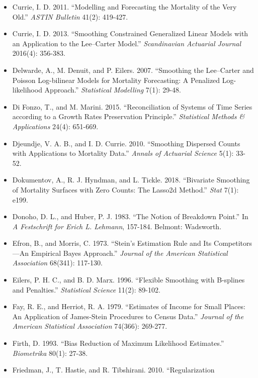 \documentclass[UTF8, fontset=macnew, a4paper, 12pt]{ctexart}
\begin{document}
\begin{itemize}[leftmargin=2em, label={}, itemsep=3pt]
        4(4): 279-298.
  \item[] Currie, I. D. 2011. ``Modelling and Forecasting the Mortality of the
        Very Old.'' \textit{ASTIN Bulletin} 41(2): 419-427.
  \item[] Currie, I. D. 2013. ``Smoothing Constrained Generalized Linear Models
        with an Application to the Lee--Carter Model.''
        \textit{Scandinavian Actuarial Journal} 2016(4): 356-383.
  \item[] Delwarde, A., M. Denuit, and P. Eilers. 2007. ``Smoothing the
        Lee--Carter and Poisson Log-bilinear Models for Mortality Forecasting:
        A Penalized Log-likelihood Approach.''
        \textit{Statistical Modelling} 7(1): 29-48.
  \item[] Di Fonzo, T., and M. Marini. 2015. ``Reconciliation of Systems of
        Time Series according to a Growth Rates Preservation Principle.''
        \textit{Statistical Methods \& Applications} 24(4): 651-669.
  \item[] Djeundje, V. A. B., and I. D. Currie. 2010. ``Smoothing Dispersed
        Counts with Applications to Mortality Data.''
        \textit{Annals of Actuarial Science} 5(1): 33-52.
  \item[] Dokumentov, A., R. J. Hyndman, and L. Tickle. 2018. ``Bivariate
        Smoothing of Mortality Surfaces with Zero Counts: The Lasso2d Method.''
        \textit{Stat} 7(1): e199.
  \item[] Donoho, D. L., and Huber, P. J. 1983. ``The Notion of Breakdown Point.''
        In \textit{A Festschrift for Erich L. Lehmann}, 157-184. Belmont: Wadsworth.
  \item[] Efron, B., and Morris, C. 1973. ``Stein's Estimation Rule and Its
        Competitors---An Empirical Bayes Approach.''
        \textit{Journal of the American Statistical Association} 68(341): 117-130.
  \item[] Eilers, P. H. C., and B. D. Marx. 1996. ``Flexible Smoothing with
        B-splines and Penalties.'' \textit{Statistical Science} 11(2): 89-102.
  \item[] Fay, R. E., and Herriot, R. A. 1979. ``Estimates of Income for Small Places:
        An Application of James-Stein Procedures to Census Data.''
        \textit{Journal of the American Statistical Association} 74(366): 269-277.
  \item[] Firth, D. 1993. ``Bias Reduction of Maximum Likelihood Estimates.''
        \textit{Biometrika} 80(1): 27-38.
  \item[] Friedman, J., T. Hastie, and R. Tibshirani. 2010. ``Regularization

\end{itemize}
\end{document}
